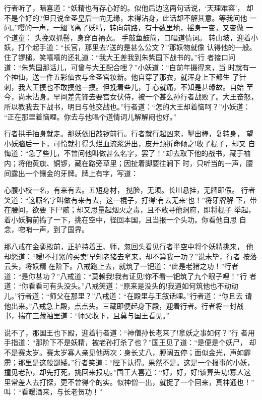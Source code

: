 行者听了，暗喜道：“妖精也有存心好的。似他后边这两句话说，‘天理难容’，
却不是个好的?但只说金圣皇后一向无缘，未得沾身，此话却不解其意。等我问他
一问。”嘤的一声，一翅飞离了妖精，转向前路，有十数里地，摇身一变，又变做
一个道童：
头挽双抓髻，身穿百衲衣。
手敲鱼鼓简，口唱道情词。
转山坡，迎着小妖，打个起手道：“长官，那里去?送的是甚么公文？”那妖物就像
认得他的一般。住了锣槌，笑嘻嘻的还礼道：“我大王差我到朱紫国下战书的。”行
者接口问道：“朱紫国那话儿，可曾与大王配合哩？”小妖道：“自前年摄得来，当
时就有一个神仙，送一件五彩仙衣与金圣宫妆新。他自穿了那衣，就浑身上下都生
了针刺，我大王摸也不敢摸他一摸。但挽着些儿，手心就痛，不知是甚缘故。自始
至今，尚未沾身。早间差先锋去要宫女伏侍，被一个甚么孙行者战败了。大王奋怒，
所以教我去下战书，明日与他交战也。”行者道：“怎的大王却着恼呵？”小妖道：
“正在那里着恼哩。你去与他唱个道情词儿解解闷也好。”

行者拱手抽身就走。那妖依旧敲锣前行。行者就行起凶来，掣出棒，复转身，
望小妖脑后一下，可怜就打得头烂血流浆迸出，皮开颈折命倾之!收了棍子，却又
自悔道：“急了些儿，不曾问他叫做甚么名字，罢了！”却去取下他的战书，藏于袖
内；将他黄旗、铜锣，藏在路旁草里；因扯着脚要往涧下时，只听当的一声，腰
间露出一个镶金的牙牌。牌上有字，写道：

心腹小校一名，有来有去。五短身材，挞脸，无须。长川悬挂，无牌即假。
行者笑道：“这厮名字叫做有来有去，这一棍子，打得‘有去无来’也！”将牙牌解
下，带在腰间，欲要下尸骸；却又思量起烟火之毒，且不敢寻他洞府，即将棍子
举起，着小妖胸前捣了一下，挑在空中，径回本国，且当报一个头功。你看他自思
自念，唿哨一声，到了国界。

那八戒在金銮殿前，正护持着王、师，忽回头看见行者半空中将个妖精挑来，
他却怨道：“嗳!不打紧的买卖!早知老猪去拿来，却不算我一功？”说未毕，行者
按落云头，将妖精在阶下。八戒跑上去，就筑了一钯道：“此是老猪之功！”行者
道：“是你甚功？”八戒道：“莫赖我!我有证见!你不看一钯筑了九个眼子哩！”行
者道：“你看看可有头没头。”八戒笑道：“原来是没头的!我道如何筑他也不动动
儿。”行者道：“师父在那里？”八戒道：“在殿里与王叙话哩。”行者道：“你且去
请他出来。”八戒急上殿，点点头。三藏即便起身下殿，迎着行者。行者将一封战
书，揣在三藏袖里道：“师父收下，且莫与国王看见。”

说不了，那国王也下殿，迎着行者道：“神僧孙长老来了!拿妖之事如何？”行
者用手指道：“那阶下不是妖精，被老孙打杀了也？”国王见了道：“是便是个妖尸，
却不是赛太岁。赛太岁寡人亲见他两次：身长丈八，膊阔五停；面似金光，声如霹
雳；那里是这般鄙矮。”行者笑道：“陛下认得。果然不是。这是一个报事的小妖，
撞见老孙，却先打死，挑回来报功。”国王大喜道：“好，好，好!该算头功!寡人这
里常差人去打探，更不曾得个的实。似神僧一出，就捉了一个回来，真神通也！”
叫：“看暖酒来，与长老贺功！”

